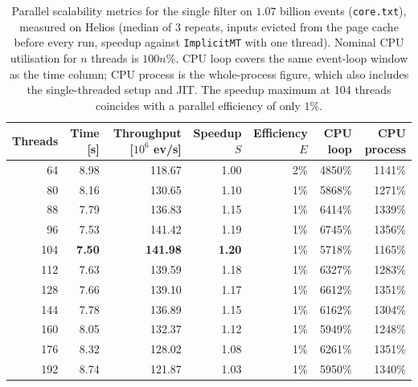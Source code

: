 \begin{table}[htbp]
\centering
\caption{Parallel scalability metrics for the single filter on $1.07$ billion events (\texttt{core.txt}), measured on Helios (median of 3 repeats, inputs evicted from the page cache before every run, speedup against \texttt{ImplicitMT} with one thread). Nominal CPU utilisation for $n$ threads is $100n\%$. CPU loop covers the same event-loop window as the time column; CPU process is the whole-process figure, which also includes the single-threaded setup and JIT. The speedup maximum at 104 threads coincides with a parallel efficiency of only $1\%$.}
\label{tab:scalability-filter}
\begin{tabular}{rrrrrrr}
\toprule
Threads & Time [s] & Throughput [$10^6$ ev/s] & Speedup $S$ & Efficiency $E$ & CPU loop & CPU process \\
\midrule
64 & 8.98 & 118.67 & 1.00 & 2\% & 4850\% & 1141\% \\
80 & 8.16 & 130.65 & 1.10 & 1\% & 5868\% & 1271\% \\
88 & 7.79 & 136.83 & 1.15 & 1\% & 6414\% & 1339\% \\
96 & 7.53 & 141.42 & 1.19 & 1\% & 6745\% & 1356\% \\
104 & \textbf{7.50} & \textbf{141.98} & \textbf{1.20} & 1\% & 5718\% & 1165\% \\
112 & 7.63 & 139.59 & 1.18 & 1\% & 6327\% & 1283\% \\
128 & 7.66 & 139.10 & 1.17 & 1\% & 6612\% & 1351\% \\
144 & 7.78 & 136.89 & 1.15 & 1\% & 6162\% & 1304\% \\
160 & 8.05 & 132.37 & 1.12 & 1\% & 5949\% & 1248\% \\
176 & 8.32 & 128.02 & 1.08 & 1\% & 6261\% & 1351\% \\
192 & 8.74 & 121.87 & 1.03 & 1\% & 5950\% & 1340\% \\
\bottomrule
\end{tabular}
\end{table}
